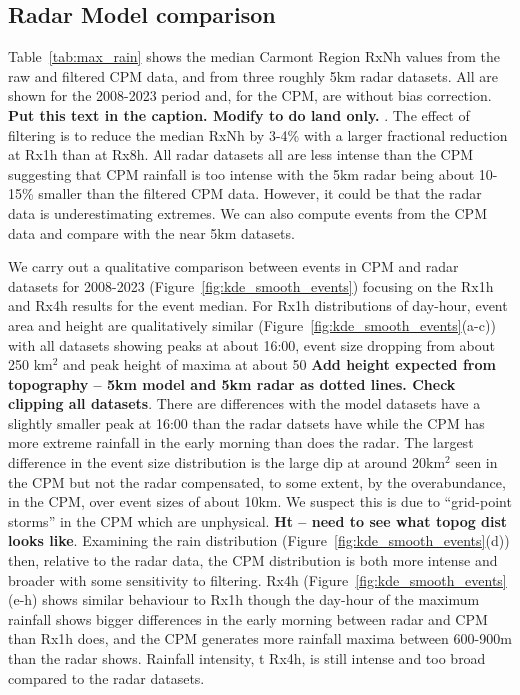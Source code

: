 \documentclass[11pt,a4paper]{article}
\begin{document}
\subsection{Radar Model comparison}

Table~\ref{tab:max_rain} shows the median Carmont Region RxNh values from the raw and filtered CPM data, and from three roughly 5km radar datasets. All are shown for the 2008-2023 period and, for the CPM, are without bias correction. \textbf{Put this text in the caption. Modify to do land only. }. The effect of filtering is to reduce the median RxNh by 3-4\% with a larger fractional reduction at Rx1h than at Rx8h.  All  radar datasets all are less intense than the CPM suggesting that  CPM rainfall is too intense with the 5km radar being about 10-15\% smaller than the filtered CPM data.  However, it could be that the radar data is underestimating extremes. We can also compute events from the CPM data and compare with the near 5km datasets. 

We carry out a qualitative comparison between events in  CPM and radar datasets for 2008-2023 (Figure~\ref{fig:kde_smooth_events}) focusing on the Rx1h and Rx4h results for the event median.  For Rx1h distributions of day-hour, event area and height are qualitatively similar  (Figure~\ref{fig:kde_smooth_events}(a-c)) with all datasets showing peaks at about 16:00, event size dropping from about 250 km$^2$ and peak height of maxima at about 50 \textbf{Add height expected from topography -- 5km model and 5km radar as dotted lines. Check clipping all datasets}.  There are differences with the model datasets have a slightly smaller peak at 16:00 than the radar datsets have while the CPM has more extreme rainfall in the early morning than does the radar. The largest difference in the event size distribution is the large dip at around 20km$^2$ seen in the CPM but not the radar compensated, to some extent, by the overabundance, in the CPM, over event sizes of about 10km. We suspect this is due to ``grid-point storms'' in the CPM which are unphysical. \textbf{Ht -- need to see what topog dist looks like}.  Examining the rain distribution (Figure~\ref{fig:kde_smooth_events}(d)) then, relative to the radar data, the CPM distribution is both more intense and broader with some sensitivity to filtering.  Rx4h (Figure~\ref{fig:kde_smooth_events}(e-h) shows similar behaviour to Rx1h though the day-hour of the maximum rainfall shows bigger differences in the early morning between radar and CPM than Rx1h does, and the CPM generates more rainfall maxima between 600-900m than the radar shows.  Rainfall intensity, t Rx4h, is still intense and too broad compared to the radar datasets. 
\end{document}
